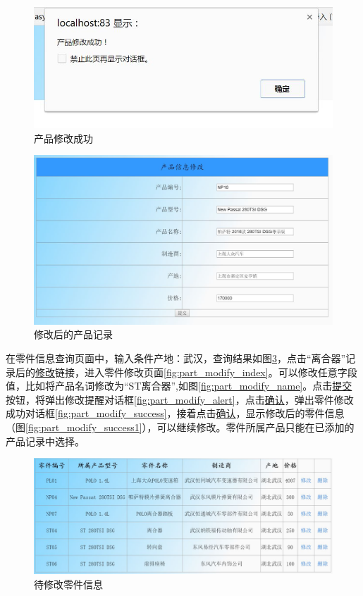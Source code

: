 \begin{figure}[H]
\centering
\includegraphics[width=0.8\linewidth]{figure/prd_mofify_success}
\caption{产品修改成功}
\label{fig:prd_mofify_success}
\end{figure}

\begin{figure}[H]
\centering
\includegraphics[width=0.8\linewidth]{figure/prd_modify_success_1}
\caption{修改后的产品记录}
\label{fig:prd_modify_success_1}
\end{figure}

在零件信息查询页面中，输入条件产地：武汉，查询结果如图\ref{fig:part_modify_inf}，点击``离合器''记录后的\underline{修改}链接，进入零件修改页面\ref{fig:part_modify_index}。可以修改任意字段值，比如将产品名词修改为``ST离合器'',如图\ref{fig:part_modify_name}。点击\underline{提交}按钮，将弹出修改提醒对话框\ref{fig:part_modify_alert}，点击\underline{确认}，弹出零件修改成功对话框\ref{fig:part_modify_success}，接着点击\underline{确认}，显示修改后的零件信息（图\ref{fig:part_modify_success1}），可以继续修改。零件所属产品只能在已添加的产品记录中选择。
\begin{figure}[H]
\centering
\includegraphics[width=0.8\linewidth]{figure/part_modify_inf}
\caption{待修改零件信息}
\label{fig:part_modify_inf}
\end{figure}


